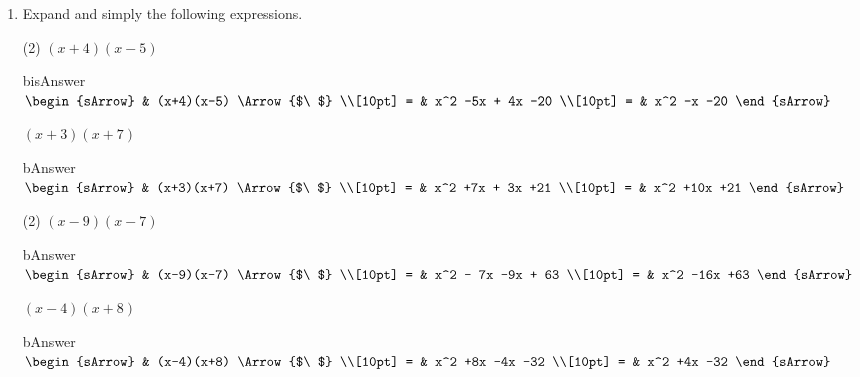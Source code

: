 \clearpage%
\begin{enumerate}[resume]
  \item Expand and simply the following expressions.
  \begin{subtask}(2)
    \task[] $(x+4)(x-5)$
              \begin{envOut}[equal height group=A-Rev-1]{bisAnswer}
			       $\begin{sArrow}
			             & (x+4)(x-5)        \Arrow{$\ $} \\[10pt]
                       = & x^2 -5x + 4x -20              \\[10pt]      
					   = & x^2 -x -20 
	                \end{sArrow}$
              \end{envOut}
    \task[] $(x+3)(x+7)$
              \begin{envOut}[equal height group=A-Rev-1]{bAnswer}
			       $\begin{sArrow}
			             & (x+3)(x+7)        \Arrow{$\ $} \\[10pt]
                       = & x^2 +7x + 3x +21               \\[10pt]      
					   = & x^2 +10x +21 
	                \end{sArrow}$
              \end{envOut}
  \end{subtask}

  \begin{subtask}(2)
    \task[] $(x-9)(x-7)$
              \begin{envOut}[equal height group=A-Rev-1]{bAnswer}
			       $\begin{sArrow}
			             & (x-9)(x-7)        \Arrow{$\ $} \\[10pt]
                       = & x^2 - 7x -9x + 63             \\[10pt]      
					   = & x^2 -16x +63
	                \end{sArrow}$
              \end{envOut}
    \task[] $(x-4)(x+8)$
              \begin{envOut}[equal height group=A-Rev-1]{bAnswer}
			       $\begin{sArrow}
			             & (x-4)(x+8)        \Arrow{$\ $} \\[10pt]
                       = & x^2 +8x -4x -32                \\[10pt]      
					   = & x^2 +4x -32
	                \end{sArrow}$
              \end{envOut}
\end{subtask}

\end{enumerate}

